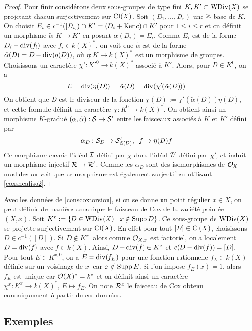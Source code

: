 \begin{proof}
Pour finir considérons deux sous-groupes de type fini $K,K'\subset \operatorname{WDiv}(X)$ se projetant chacun surjectivement sur $\operatorname{Cl}(X)$. Soit $(D_1,...,D_r)$ une $\mathbb{Z}$-base de $K$. On choisit $E_i\in c^{-1}([D_i])\cap K'=(D_i+\operatorname{Ker} c)\cap K'$ pour $1\leq i\leq r$ et on définit un morphisme $\tilde{\alpha}:K\rightarrow K'$ en posant $\alpha(D_i)=E_i$. Comme $E_i$ est de la forme $D_i-\operatorname{div}(f_i)$ avec $f_i\in k(X)^*$, on voit que $\tilde{\alpha}$ est de la forme $\tilde{\alpha}(D)=D-\operatorname{div}(\eta(D))$, où $\eta:K\rightarrow k(X)^*$ est un morphisme de groupes. Choisissons un caractère $\chi':K'^0\rightarrow k(X)^*$ associé à $K'$. Alors, pour $D\in K^0$, on a
$$D-\operatorname{div}(\eta(D))=\tilde{\alpha}(D)=\operatorname{div}(\chi'(\tilde{\alpha}(D)))$$
On obtient que $D$ est le diviseur de la fonction $\chi(D):=\chi'(\tilde{\alpha}(D))\eta(D)$, et cette formule définit un caractère $\chi:K^0\rightarrow k(X)^*$. On obtient ainsi un morphisme $K$-gradué $(\alpha,\tilde{\alpha}):\mathcal{S}\rightarrow \mathcal{S}'$ entre les faisceaux associés à $K$ et $K'$ défini par
$$\alpha_D:\mathcal{S}_D\rightarrow \mathcal{S}'_{\tilde{\alpha}(D)},\,\,\, f\mapsto\eta(D)f$$
Ce morphisme envoie l'idéal $\mathcal{I}$ défini par $\chi$ dans l'idéal $\mathcal{I}'$ défini par $\chi'$, et induit un morphisme injectif $\mathcal{R}\rightarrow \mathcal{R}'$. Comme les $\alpha_D$ sont des isomorphismes de $\mathcal{O}_X$-modules on voit que ce morphisme est également surjectif en utilisant \ref{coxsheafiso2}.
\end{proof}

\begin{rem}
Avec les données de \ref{conscoxtorsion}, si on se donne un point régulier $x\in X$, on peut définir de manière canonique le faisceau de Cox de la variété pointée $(X, x)$. Soit $K^x:=\lbrace D\in\operatorname{WDiv}(X)\mid x\notin \operatorname{Supp} D\rbrace$.  Ce sous-groupe de $\operatorname{WDiv}(X)$ se projette surjectivement sur $\operatorname{Cl}(X)$. En effet pour tout $[D]\in \operatorname{Cl}(X)$, choisissons $D\in c^{-1}([D])$. Si $D\notin K^x$, alors comme $\mathcal{O}_{X,x}$ est factoriel, on a localement $D=\operatorname{div}(f)$ avec $f\in k(X)$. Ainsi, $D-\operatorname{div}(f)\in K^x$ et $c(D-\operatorname{div}(f)) =[D]$. Pour tout $E\in K^{x,0}$, on a $E=\operatorname{div}(f_E)$ pour une fonction rationnelle $f_E\in k(X)$ définie sur un voisinage de $x$, car $x\notin \operatorname{Supp} E$. Si l'on impose $f_E(x)=1$, alors $f_E$ est unique car $\mathcal{O}(X)^*=k^*$ et on définit ainsi un caractère $\chi^x:K^x\rightarrow k(X)^*,\,E\mapsto f_E$. On note $\mathcal{R}^x$ le faisceau de Cox obtenu canoniquement à partir de ces données.
\end{rem}

\subsection{Exemples}

